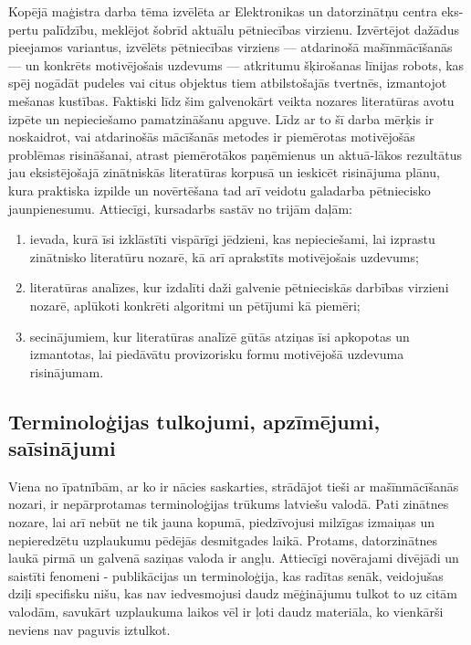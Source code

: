 \documentclass[12pt, a4paper]{article}
\numberwithin{equation}{section} %
\begin{document}
Kopējā maģistra darba tēma izvēlēta ar Elektronikas un datorzinātņu centra eks-pertu palīdzību, meklējot šobrīd aktuālu pētniecības virzienu. Izvērtējot dažādus pieejamos variantus, izvēlēts pētniecības virziens --- atdarinošā mašīnmācīšanās --- un konkrēts motivējošais uzdevums --- atkritumu šķirošanas līnijas robots, kas spēj nogādāt pudeles vai citus objektus tiem atbilstošajās tvertnēs, izmantojot mešanas kustības. Faktiski līdz šim galvenokārt veikta nozares literatūras avotu izpēte un nepieciešamo pamatzināšanu apguve. Līdz ar to šī darba mērķis ir noskaidrot, vai atdarinošās mācīšanās metodes ir piemērotas motivējošās problēmas risināšanai, atrast piemērotākos paņēmienus un aktuā-lākos rezultātus jau eksistējošajā zinātniskās literatūras korpusā un ieskicēt risinājuma plānu, kura praktiska izpilde un novērtēšana tad arī veidotu galadarba pētniecisko jaunpienesumu. Attiecīgi, kursadarbs sastāv no trijām daļām:
\begin{enumerate}
    \item ievada, kurā īsi izklāstīti vispārīgi jēdzieni, kas nepieciešami, lai izprastu zinātnisko literatūru nozarē, kā arī aprakstīts motivējošais uzdevums;
    \item literatūras analīzes, kur izdalīti daži galvenie pētnieciskās darbības virzieni nozarē, aplūkoti konkrēti algoritmi un pētījumi kā piemēri;
    \item secinājumiem, kur literatūras analīzē gūtās atziņas īsi apkopotas un izmantotas, lai piedāvātu provizorisku formu motivējošā uzdevuma risinājumam.
\end{enumerate}


\subsection{Terminoloģijas tulkojumi, apzīmējumi, saīsinājumi}

Viena no īpatnībām, ar ko ir nācies saskarties, strādājot tieši ar mašīnmācīšanās nozari, ir nepārprotamas terminoloģijas trūkums latviešu valodā. Pati zinātnes nozare, lai arī nebūt ne tik jauna kopumā, piedzīvojusi milzīgas izmaiņas un nepieredzētu uzplaukumu pēdējās desmitgades laikā. Protams, datorzinātnes laukā pirmā un galvenā saziņas valoda ir angļu. Attiecīgi novērajami divējādi un saistīti fenomeni - publikācijas un terminoloģija, kas radītas senāk, veidojušas dziļi specifisku nišu, kas nav iedvesmojusi daudz mēģinājumu tulkot to uz citām valodām, savukārt uzplaukuma laikos vēl ir ļoti daudz materiāla, ko vienkārši neviens nav paguvis iztulkot.
\end{document}
